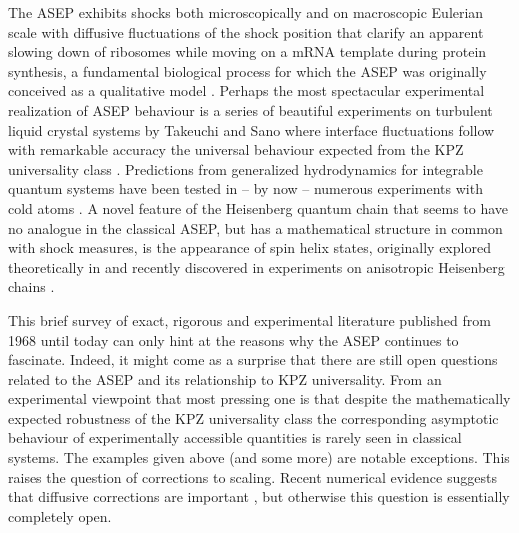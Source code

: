 \documentclass[12pt]{article}
\begin{document}
The ASEP exhibits shocks both microscopically and on macroscopic 
Eulerian scale \cite{Reza91,Ferr91,Derr93b,Kreb03} with diffusive 
fluctuations of the shock position \cite{Ferr94a,Beli02} that clarify 
\cite{Schu97a} an apparent slowing down of ribosomes while moving 
on a mRNA template during protein synthesis, a fundamental biological 
process for which the ASEP was originally conceived as a qualitative 
model \cite{MacD68}. Perhaps the most spectacular experimental 
realization of ASEP behaviour is a series of beautiful experiments on 
turbulent liquid crystal systems by Takeuchi and Sano where interface 
fluctuations follow with remarkable accuracy the universal behaviour 
expected from the KPZ universality class \cite{Take10,Take11}. 
Predictions from generalized hydrodynamics for integrable quantum 
systems have been tested in -- by now -- numerous experiments with 
cold atoms \cite{Vidm15,Lang15,Kerr23}. A novel feature of the 
Heisenberg quantum chain that seems to have no analogue in the 
classical ASEP, but has a mathematical structure in common with 
shock measures, is the appearance of spin helix states, originally 
explored theoretically in \cite{Popk17,Popk21} and recently discovered 
in experiments on anisotropic Heisenberg chains \cite{Jeps22}.


This brief survey of exact, rigorous and experimental literature 
published from 1968 until today can only hint at the reasons why the 
ASEP continues to fascinate. Indeed, it might come as a surprise that 
there are still open questions related to the ASEP and 
its relationship to KPZ universality. From an experimental viewpoint
that most pressing one is that despite the mathematically expected 
robustness of the KPZ universality class the corresponding asymptotic
behaviour of experimentally accessible quantities is rarely seen in 
classical systems. The examples given above (and some more) are
notable exceptions. This raises the question of corrections to scaling.
Recent numerical evidence suggests that diffusive corrections are 
important \cite{Schm21}, but otherwise this question is essentially 
completely open. 
\end{document}
